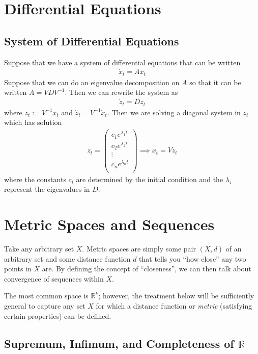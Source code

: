 \documentclass[12pt]{article}
\numberwithin{equation}{section} %
\theoremstyle{plain}
\theoremstyle{definition}
\theoremstyle{remark}
\newcommand{\dx}{\dot{x}}
\newcommand{\dz}{\dot{z}}
\newcommand{\R}{\mathbb{R}}
\begin{document}
\clearpage
\section{Differential Equations}

\subsection{System of Differential Equations}

Suppose that we have a system of differential equations that can be
written
\begin{align*}
  \dx_t = Ax_t
\end{align*}
Suppose that we can do an eigenvalue decomposition on $A$ so that it can
be written $A = VD V^{-1}$. Then we can rewrite the system as
\begin{align*}
  \dz_t = Dz_t
\end{align*}
where $z_t:= V^{-1}x_t$ and $\dz_t=V^{-1}\dx_t$. Then we are solving a
diagonal system in $z_t$ which has solution
\begin{align*}
  z_t =
  \begin{pmatrix}
    c_1 e^{\lambda_1 t} \\
    c_2 e^{\lambda_2 t} \\
    \vdots \\
    c_n e^{\lambda_n t} \\
  \end{pmatrix}
  \implies
  x_t = V z_t
\end{align*}
where the constants $c_i$ are determined by the initial condition and
the $\lambda_i$ represent the eigenvalues in $D$.




\clearpage
\section{Metric Spaces and Sequences}

Take any arbitrary set $X$. Metric spaces are simply some pair $(X,d)$
of an arbitrary set and some distance function $d$ that tells you ``how
close'' any two points in $X$ are. By defining the concept of
``closeness'', we can then talk about convergence of sequences within
$X$.

The most common space is $\R^k$; however, the treatment below
will be sufficiently general to capture any set $X$ for which a distance
function or \emph{metric} (satisfying certain properties) can be
defined.

\subsection{Supremum, Infimum, and Completeness of $\R$}
\end{document}
